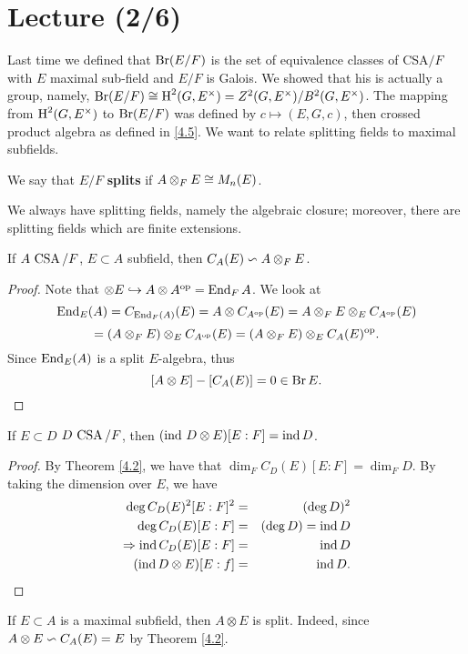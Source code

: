 \section{Lecture (2/6)}
Last time we defined that $\operatorname{Br} (E/F)$ is the set of equivalence classes of CSA$/F$ with $E$ maximal sub-field and $E/F$ is Galois. We showed that his is actually a group, namely, $\operatorname{Br} (E/F) \cong \text{H}^2(G,E^{\times}) = Z^2(G,E^{\times})/B^2(G,E^{\times})$. The mapping from $\text{H}^2(G,E^{\times})$ to $\operatorname{Br}(E/F)$ was defined by $c \mapsto (E,G,c)$, then crossed product algebra as defined in \ref{4.5}. We want to relate splitting fields to maximal subfields. 

\begin{defn}\label{5.1}
We say that $E/F$ \textbf{splits} if $A \otimes_F E \cong M_n(E)$.
\end{defn}

We always have splitting fields, namely the algebraic closure; moreover, there are splitting fields which are finite extensions. 
\begin{lemma}\label{5.2}
If $A \, \operatorname{CSA}/F$, $E \subset A$ subfield, then 
$C_A(E) \backsim A \otimes_F E$.
\end{lemma}
\begin{proof}
Note that $\otimes E \hookrightarrow  A\otimes A^{\operatorname{op}} = \operatorname{End}_FA$. We look at $$\operatorname{End}_E(A) = C_{\operatorname{End}_F(A)}(E) = A \otimes C_{A^{\operatorname{op}}}(E) = A \otimes_F E \otimes_E C_{A^{\operatorname{op}}}(E)$$ $$ = (A\otimes_F E)\otimes_E C_{A^{\operatorname{op}}}(E) = (A\otimes_F E)\otimes_E C_{A}(E)^{\operatorname{op}}.$$ 
Since $\operatorname{End}_E(A)$ is a split $E$-algebra, thus
$$[A\otimes E] - [C_A(E)] = 0 \in \operatorname{Br} E.$$
\end{proof}
\begin{coro}\label{5.3}
If $E \subset D$ $D \, \operatorname{CSA}/F$, then $(\operatorname{ind} \, D\otimes E)[E:F] = \operatorname{ind} D$.
\end{coro}
\begin{proof}
By Theorem \ref{4.2}, we have that $\dim_F C_D(E)[E:F] = \dim_F D$. By taking the dimension over $E$, we have
\begin{eqnarray*}
\deg C_D(E)^2 [E:F]^2 &=& (\deg D)^2 \\
\deg C_D(E) [E:F] &=& (\deg D) = \operatorname{ind} D \\
\Rightarrow \operatorname{ind} C_D(E)[E:F] & = & \operatorname{ind} D \\
(\operatorname{ind} D \otimes E)[E:f] & = & \operatorname{ind} D.
\end{eqnarray*}
\end{proof}
\begin{remark}\label{5,4}
If $E \subset A$ is a maximal subfield, then $A \otimes E$ is split. Indeed, since $A \otimes E\backsim C_A(E) = E$ by Theorem \ref{4.2}.

\end{remark}

